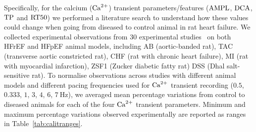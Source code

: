 \vspace{0.2cm}
Specifically, for the calcium ($\textrm{Ca}^{2+}$) transient parameters/features ($\textrm{AMPL}$, $\textrm{DCA}$, $\textrm{TP}$ and $\textrm{RT50}$) we performed a literature search to understand how these values could change when going from diseased to control animal in rat heart failure. We collected experimental observations from $30$ experimental studies~\cite{Abdellatif:2021, An:2019, Berni:2009, Bode:2020, Bode:2021, Call:1998, Chang:1997, Chen:2020, Curl:2018, Deel:2017, Gattoni:2017, Hohendanner:2018, Hu:2011, Ito:1997, Kagaya:1995, Kagaya:1996, Kennedy:2003, Kilfoil:2020, Kim:2017, Loennechen:2002, Loennechen:2002*a, Lyon:2009, Lyon:2011, Maczewski:2008, Maier:1998, Meissner:1998, Min:2002, Miranda-Silva:2020, Rouhana:2019, Sadredini:2016} on both HFrEF and HFpEF animal models, including AB (aortic-banded rat), TAC (transverse aortic constricted rat), CHF (rat with chronic heart failure), MI (rat with myocardial infarction), ZSF1 (Zucker diabetic fatty rat) DSS (Dhal salt-sensitive rat). To normalise observations across studies with different animal models and different pacing frequencies used for $\textrm{Ca}^{2+}$ transient recording ($0.5$, $0.333$, $1$, $3$, $4$, $6$, $\SI{7}{\hertz}$), we averaged mean percentage variations from control to diseased animals for each of the four $\textrm{Ca}^{2+}$ transient parameters. Minimum and maximum percentage variations observed experimentally are reported as ranges in Table~\ref{tab:calitranges}.

